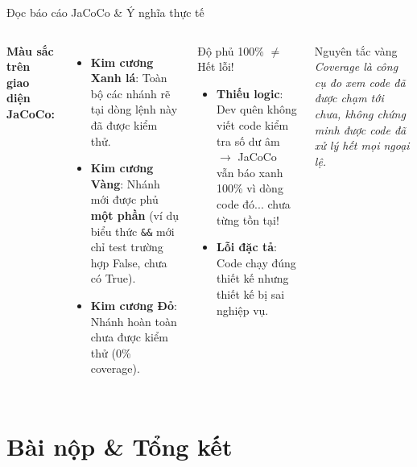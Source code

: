 \documentclass[aspectratio=169,12pt]{beamer}
\begin{document}
\begin{frame}[shrink=10]{Đọc báo cáo JaCoCo \& Ý nghĩa thực tế}
  \begin{columns}[T]
    \textbf{Màu sắc trên giao diện JaCoCo:}
    \begin{itemize}\setlength{\itemsep}{0.25em}
      \item \textcolor{green!60!black}{\textbf{Kim cương Xanh lá}}: Toàn bộ các nhánh rẽ tại dòng lệnh này đã được kiểm thử.
      \item \textcolor{orange!85!black}{\textbf{Kim cương Vàng}}: Nhánh mới được phủ \textbf{một phần} (ví dụ biểu thức \texttt{\&\&} mới chỉ test trường hợp False, chưa có True).
      \item \textcolor{red!70!black}{\textbf{Kim cương Đỏ}}: Nhánh hoàn toàn chưa được kiểm thử (0\% coverage).
    \end{itemize}

    \begin{alertblock}{Độ phủ 100\% $\neq$ Hết lỗi!}
      \begin{itemize}\setlength{\itemsep}{0.2em}
        \item \textbf{Thiếu logic}: Dev quên không viết code kiểm tra số dư âm $\to$ JaCoCo vẫn báo xanh 100\% vì dòng code đó... chưa từng tồn tại!
        \item \textbf{Lỗi đặc tả}: Code chạy đúng thiết kế nhưng thiết kế bị sai nghiệp vụ.
      \end{itemize}
    \end{alertblock}
    \begin{block}{\small Nguyên tắc vàng}
      \footnotesize \textit{Coverage là công cụ đo xem code đã được chạm tới chưa, không chứng minh được code đã xử lý hết mọi ngoại lệ.}
    \end{block}
  \end{columns}
\end{frame}

\section{Bài nộp \& Tổng kết}
\end{document}
